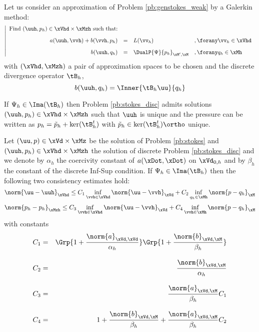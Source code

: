 Let us consider an approximation of Problem \ref{pb:genstokes_weak} by a Galerkin method:
\begin{equation*}\label{pb:stokes_disc}
\left\vert
\begin{array}{rlll}
\mbox{Find $(\uuh,p_h)\in \xVhd\times\xMzh$ such that:}\\[2ex]
\displaystyle a(\uuh,\vvh) + b(\vvh, p_h) &=& L(\vv_h)& ,\forany\vv_h\in\xVhd\\[2ex]
\displaystyle b(\uuh,q_h) &=& \DualP{\Psi}{p_h}_{\xM',\xM} & ,\forany q_h\in\xMh
\end{array}
\right.
\end{equation*}
with $(\xVhd,\xMzh)$ a pair of approximation spaces to be chosen and the discrete divergence operator $\tB_h$,
\begin{equation*}
b(\uuh,q_h) = \Inner{\tB_h\uu}{q_h}
\end{equation*}

\begin{thrm}
If $\Psi_h \in \Ima(\tB_h)$ then Problem \eqref{pb:stokes_disc} admits solutions $(\uuh,p_h)\in\xVhd\times\xMzh$ such that $\uuh$ is unique and the pressure can be written as $p_h = \tilde p_h + \ker(\tB^t_h)$ with $\tilde p_h \in \ker(\tB^t_h)\ortho$ unique.
\end{thrm}

\begin{thrm}
Let $(\uu,p)\in\xVd\times\xMz$ be the solution of Problem \eqref{pb:stokes} and $(\uuh,p_h)\in\xVhd\times\xMzh$  the solution of discrete Problem \eqref{pb:stokes_disc} and we denote by $\alpha_h$ the coercivity constant of $a(\xDot,\xDot)$ on $\xVd_{0,h}$ and by $\beta_h$ the constant of the discrete Inf-Sup condition.
If $\Psi_h \in \Ima(\tB_h)$ then the following two consistency estimates hold:
\begin{equation*}
\norm{\uu - \uuh}_{\xVhd} \leq C_1 \inf_{\vvh\in\xVhd}\norm{\uu - \vvh}_{\xVd} + C_2 \inf_{q_h\in\xMh}\norm{p - q_h}_{\xM}
\end{equation*}
\begin{equation*}
\norm{p_h - p_h}_{\xMzh} \leq C_3 \inf_{\vvh\in\xVhd}\norm{\uu - \vvh}_{\xVd} + C_4 \inf_{\vvh\in\xMh}\norm{p - q_h}_{\xM}
\end{equation*}
with constants
\begin{eqnarray*}
C_1 &=& \Grp{ 1 + \dfrac{\norm{a}_{\xVd,\xVd}}{\alpha_h}}\Grp{ 1 + \dfrac{\norm{b}_{\xVd,\xM}}{\beta_h} } \\[2ex]
C_2 &=& \dfrac{\norm{b}_{\xVd,\xM}}{\alpha_h}\\[2ex]
C_3 &=& \dfrac{\norm{a}_{\xVd,\xM}}{\beta_h} C_1 \\[2ex]
C_4 &=& 1 + \dfrac{\norm{b}_{\xVd,\xM}}{\beta_h} + \dfrac{\norm{a}_{\xVd,\xM}}{\beta_h} C_2 \\[2ex]
\end{eqnarray*}
\end{thrm}

